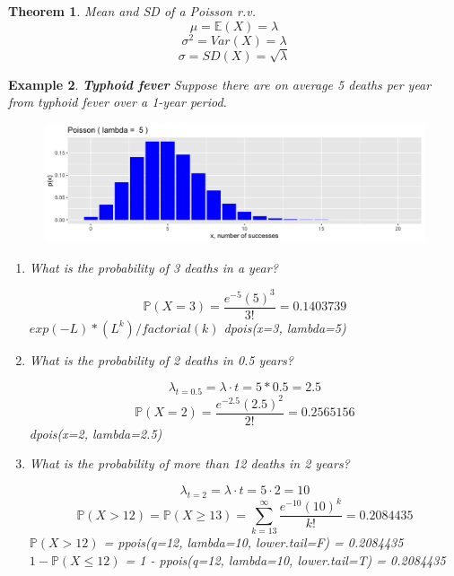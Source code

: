 \documentclass[12pt]{amsart}
\newtheorem{theorem}{Theorem}[section]
\newtheorem{example}[theorem]{Example}
\newcommand{\bP}{\mathbb{P}}
\begin{document}
{\begin{theorem}{Mean and SD of a Poisson r.v.}
\color{blue}
$$\mu = \mathbb{E}(X) = \lambda$$
$$\sigma^2= Var(X) = \lambda$$
$$\sigma = SD(X) =  \sqrt{\lambda}$$
\color{black}
\vspace{1cm}


\end{theorem}

\newpage
\begin{example}  \textbf{Typhoid fever} \newline
Suppose there are on average 5 deaths per year from typhoid fever over a 1-year period. 

\begin{figure}[h!]
  \includegraphics[width=5in]{img/Poisson_L5.png}
\end{figure}


\begin{enumerate}
\item What is the probability of 3 deaths in a year?

\color{blue}
$$\bP(X = 3) = \frac{e^{-5}(5)^{3}}{3!}  = 0.1403739$$
$exp(-L)*(L^k)/factorial(k)$ \newline
dpois(x=3, lambda=5)
\color{black}

\vfill
\item What is the probability of 2 deaths in 0.5 years?

\color{blue}
$$ \lambda_{t=0.5} = \lambda\cdot t = 5*0.5 = 2.5$$
$$\bP(X = 2) = \frac{e^{-2.5}(2.5)^{2}}{2!}  = 0.2565156$$
dpois(x=2, lambda=2.5)
\color{black}

\vfill

\item What is the probability of more than 12 deaths in 2 years?

\color{blue}
$$ \lambda_{t=2} = \lambda \cdot t = 5\cdot2 = 10$$
$$\bP(X > 12) = \bP(X \geq 13) = \sum_{k=13}^{\infty}\frac{e^{-10}(10)^{k}}{k!}  = 0.2084435$$
$\bP(X > 12)$ = ppois(q=12, lambda=10, lower.tail=F) = 0.2084435 \newline
$1 - \bP(X \leq 12)$ = 1 - ppois(q=12, lambda=10, lower.tail=T) = 0.2084435
\color{black}


\end{enumerate}
\end{example}}
\end{document}
